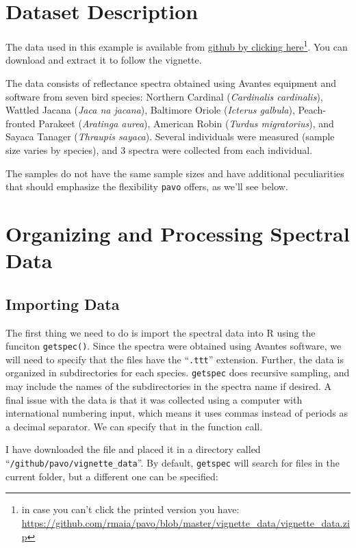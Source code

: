 \documentclass{article}
\newcommand{\pavo}{{\tt pavo}}  %
\newcommand{\code}[1]{{\tt #1}}  %
\begin{document}
\section{Dataset Description}

The data used in this example is available from 
\href{https://github.com/rmaia/pavo/blob/master/vignette_data/vignette_data.zip}
{github by clicking here}\footnote{in case you can't click the printed version you have:\\ 
\url{https://github.com/rmaia/pavo/blob/master/vignette_data/vignette_data.zip}}. 
You can download and extract it to follow the vignette.

The data consists of reflectance spectra obtained using Avantes equipment and software from 
seven bird species: Northern Cardinal (\emph{Cardinalis cardinalis}), Wattled Jacana (\emph{Jaca
na jacana}), Baltimore Oriole (\emph{Icterus galbula}), Peach-fronted Parakeet (\emph{Aratinga 
aurea}), American Robin (\emph{Turdus migratorius}),  and Sayaca Tanager 
(\emph{Thraupis sayaca}). Several individuals were measured (sample size varies by species), and 
3 spectra were collected from each individual.

The samples do not have the same sample sizes and have additional peculiarities that should 
emphasize the flexibility \pavo{} offers, as we'll see below.

\section{Organizing and Processing Spectral Data}

\subsection{Importing Data}

The first thing we need to do is import the spectral data into R using the funciton 
\code{getspec()}. Since the spectra were obtained using Avantes software, we will need to 
specify that the files have the ``\code{.ttt}'' extension. Further, the data is organized in 
subdirectories for each species. \code{getspec} does recursive sampling, and may include the 
names of the subdirectories in the spectra name if desired. A final issue with the data is that 
it was collected using a computer with international numbering input, which means it uses commas 
instead of periods as a decimal separator. We can specify that in the function call.

I have downloaded the file and placed it in a directory called 
``\nolinkurl{/github/pavo/vignette_data}''. By default, \code{getspec} will search for files in 
the current folder, but a different one can be specified:
\end{document}
